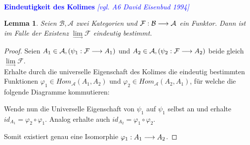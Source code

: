 \documentclass[10pt,a4paper]{report}
\newcommand{\ModulsOfDifferenzials}{David Eisenbud 1994}
\newcounter{Aussage}[chapter]
\newtheorem{lemma}[Aussage]{Lemma}
\newcommand{\functionfront}[3]{\nolinebreak{#1:#2 \longrightarrow #3}}
\newcommand{\colimes}[0]{\lim\limits_{ \longrightarrow }}
\begin{document}
\ \\
\textcolor{blue}{\textbf{Eindeutigkeit des Kolimes} \textit{[vgl. A6 \ModulsOfDifferenzials]}}
\begin{lemma}\label{Eindeutigkeit des Kolimes}
Seien $\mathcal{B},\mathcal{A}$ zwei Kategorien und $\functionfront{\mathcal{F}}{\mathcal{B}}{\mathcal{A}}$ ein Funktor. Dann ist im Falle der Existenz $\colimes \mathcal{F}$ eindeutig bestimmt.
\end{lemma}
\begin{proof}
Seien $A_1 \in \mathcal{A}, (\functionfront{\psi_1}{\mathcal{F}}{A_1}) $ und $A_2 \in \mathcal{A} , (\functionfront{\psi_2}{\mathcal{F}}{A_2}) $ beide gleich $\colimes \mathcal{F}$.\\
Erhalte durch die universelle Eigenschaft des Kolimes die eindeutig bestimmten Funktionen $\varphi_1 \in Hom_{\mathcal{A}}(A_1,A_2)$ und $\varphi_2 \in Hom_{\mathcal{A}}(A_2,A_1)$, für welche die folgende Diagramme kommutieren:
\begin{center}
\end{center}
\begin{flushleft}
Wende nun die Universelle Eigenschaft von $\psi_1$ auf $\psi_1$ selbst an und erhalte $id_{A_1} = \varphi_2 \circ \varphi_1$. Analog erhalte auch $id_{A_2} = \varphi_1 \circ \varphi_2$.
\end{flushleft}
\begin{center}
\end{center}
Somit existiert genau eine Isomorphie $\functionfront{\varphi_1}{A_1}{A_2}$.
\end{proof}
\end{document}
